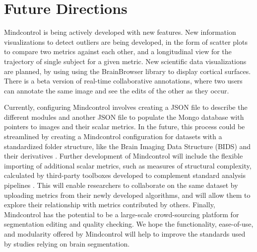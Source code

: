 \section{Future Directions}

Mindcontrol is being actively developed with new features. New information visualizations to detect outliers are being developed, in the form of scatter plots to compare two metrics against each other, and a longitudinal view for the trajectory of single subject for a given metric. New scientific data visualizations are planned, by using using the BrainBrowser library \cite{Sherif_2015} to display cortical surfaces. There is a beta version of real-time collaborative annotations, where two users can annotate the same image and see the edits of the other as they occur. 

Currently, configuring Mindcontrol involves creating a JSON file to describe the different modules and another JSON file to populate the Mongo database with pointers to images and their scalar metrics. In the future, this process could be streamlined by creating a Mindcontrol configuration for datasets with a standardized folder structure, like the Brain Imaging Data Structure (BIDS) \cite{Gorgolewski_2016} and their derivatives \cite{gorgolewski2016bids}. Further development of Mindcontrol will include the flexible importing of additional scalar metrics, such as measures of structural complexity, calculated by third-party toolboxes developed to complement standard analysis pipelines \cite{madan2016,madan2017}. This will enable researchers to collaborate on the same dataset by uploading metrics from their newly developed algorithms, and will allow them to explore their relationship with metrics contributed by others. Finally, Mindcontrol has the potential to be a large-scale crowd-sourcing platform for segmentation editing and quality checking. We hope the functionality, ease-of-use, and modularity offered by Mindcontrol will help to improve the standards used by studies relying on brain segmentation.
